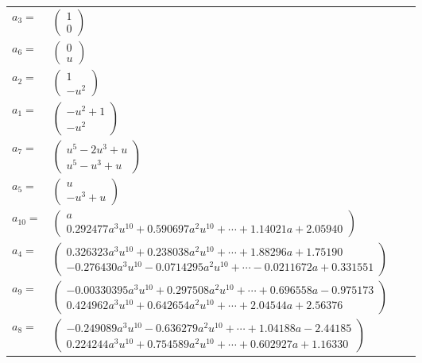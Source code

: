 \documentclass[1p]{elsarticle_modified}
\theoremstyle{definition}
\begin{document}
\begin{tabular}{m{7pt} m{180pt} m{7pt} m{180pt} }
\flushright $a_{3}=$&$\begin{pmatrix}1\\0\end{pmatrix}$ \\
\flushright $a_{6}=$&$\begin{pmatrix}0\\u\end{pmatrix}$ \\
\flushright $a_{2}=$&$\begin{pmatrix}1\\- u^2\end{pmatrix}$ \\
\flushright $a_{1}=$&$\begin{pmatrix}- u^2+1\\- u^2\end{pmatrix}$ \\
\flushright $a_{7}=$&$\begin{pmatrix}u^5-2 u^3+u\\u^5- u^3+u\end{pmatrix}$ \\
\flushright $a_{5}=$&$\begin{pmatrix}u\\- u^3+u\end{pmatrix}$ \\
\flushright $a_{10}=$&$\begin{pmatrix}a\\0.292477 a^{3} u^{10}+0.590697 a^{2} u^{10}+\cdots+1.14021 a+2.05940\end{pmatrix}$ \\
\flushright $a_{4}=$&$\begin{pmatrix}0.326323 a^{3} u^{10}+0.238038 a^{2} u^{10}+\cdots+1.88296 a+1.75190\\-0.276430 a^{3} u^{10}-0.0714295 a^{2} u^{10}+\cdots-0.0211672 a+0.331551\end{pmatrix}$ \\
\flushright $a_{9}=$&$\begin{pmatrix}-0.00330395 a^{3} u^{10}+0.297508 a^{2} u^{10}+\cdots+0.696558 a-0.975173\\0.424962 a^{3} u^{10}+0.642654 a^{2} u^{10}+\cdots+2.04544 a+2.56376\end{pmatrix}$ \\
\flushright $a_{8}=$&$\begin{pmatrix}-0.249089 a^{3} u^{10}-0.636279 a^{2} u^{10}+\cdots+1.04188 a-2.44185\\0.224244 a^{3} u^{10}+0.754589 a^{2} u^{10}+\cdots+0.602927 a+1.16330\end{pmatrix}$ \\

\end{tabular}
\end{document}
